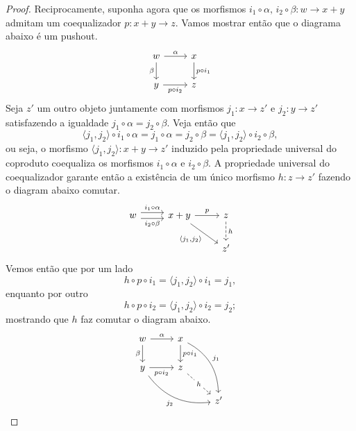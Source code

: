 \begin{proof}
    Reciprocamente, suponha agora que os morfismos $i_1 \circ \alpha,\, i_2 \circ \beta: w \to x+y$ admitam um coequalizador $p: x+y \to z$.
    Vamos mostrar então que o diagrama abaixo é um pushout.
    \begin{displaymath}
        \begin{tikzcd}
            w
            \arrow[r, "\alpha"]
            \arrow[d, "\beta" swap]
            & x
            \arrow[d, "p \circ i_1"]
            \\ y
            \arrow[r, "p \circ i_2" swap]
            & z
        \end{tikzcd}
    \end{displaymath}
    Seja $z'$ um outro objeto juntamente com morfismos $j_1: x \to z'$ e $j_2: y \to z'$ satisfazendo a igualdade $j_1 \circ \alpha = j_2 \circ \beta$.
    Veja então que
    \begin{displaymath}
      \langle j_1,j_2 \rangle \circ i_1 \circ \alpha = j_1 \circ \alpha = j_2 \circ \beta = \langle j_1,j_2 \rangle \circ i_2 \circ \beta,
    \end{displaymath}
    ou seja, o morfismo $\langle j_1, j_2 \rangle: x+y \to z'$ induzido pela propriedade universal do coproduto coequaliza os morfismos $i_1 \circ \alpha$ e $i_2 \circ \beta$.
    A propriedade universal do coequalizador garante então a existência de um único morfismo $h: z \to z'$ fazendo o diagram abaixo comutar.
    \begin{displaymath}
        \begin{tikzcd}
            w
            \arrow[r, shift left=1.25, "i_1 \circ \alpha"]
            \arrow[r, shift right=1.25, "i_2 \circ \beta" swap]
            & x+y
            \arrow[r, "p"]
            \arrow[rd, "{\langle j_1,j_2 \rangle}" swap]
            & z
            \arrow[d, dashed, "h"]
            \\ & & z'
        \end{tikzcd}
    \end{displaymath}
    Vemos então que por um lado
    \begin{displaymath}
        h \circ p \circ i_1
        = \langle j_1,j_2 \rangle \circ i_1
        = j_1,
    \end{displaymath}
    enquanto por outro
    \begin{displaymath}
      h \circ p \circ i_2
      = \langle j_1,j_2 \rangle \circ i_2
      = j_2;
    \end{displaymath}
    mostrando que $h$ faz comutar o diagram abaixo.
    \begin{displaymath}
      \begin{tikzcd}
         w
         \arrow[r, "\alpha"]
         \arrow[d, "\beta" swap]
          & x
          \arrow[d, "p \circ i_1"]
          \arrow[rdd, bend left=30, "j_1"]
          \\ y
          \arrow[r, "p \circ i_2" swap]
          \arrow[rrd, bend right=30, "j_2" swap]
          & z
          \arrow[rd, dashed, "h" description]
          \\ & & z'
      \end{tikzcd}
    \end{displaymath}


\end{proof}
